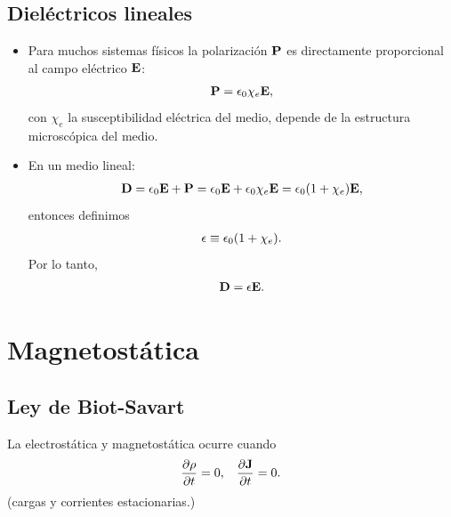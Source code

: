\subsection{Dieléctricos lineales}
\begin{itemize}
\item Para muchos sistemas físicos la polarización $\vb{P}$ es directamente 
proporcional al campo eléctrico $\vb{E}$:
\begin{align}
\vb{P}=\epsilon_0 \chi_e\vb{E},
\end{align}
con $\chi_e$ la susceptibilidad eléctrica del medio, depende 
de la estructura microscópica del medio.

\item En un medio lineal:
\begin{align}
\vb{D}=\epsilon_0\vb{E}+\vb{P}=\epsilon_0\vb{E}+\epsilon_0\chi_e\vb{E}=
\epsilon_0\qty(1+\chi_e)\vb{E},
\end{align}
entonces definimos
\begin{align}
\epsilon \equiv  \epsilon_0\qty(1+\chi_e).
\end{align}
Por lo tanto,
\begin{align*}
\vb{D}=\epsilon\vb{E}.
\end{align*}
\end{itemize}

\section{Magnetostática}
\subsection{Ley de Biot-Savart}
La electrostática y magnetostática ocurre cuando
\begin{align*}
\pdv{\rho}{t}=0, \hspace{3mm} \pdv{\vb{J}}{t}=0.
\end{align*}
(cargas y corrientes estacionarias.)

